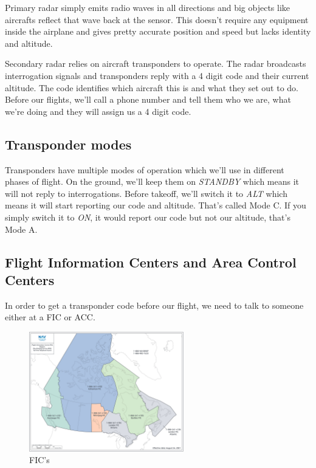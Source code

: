 \documentclass[12pt,letterpaper]{article}
\begin{document}
        Primary radar simply emits radio waves in all directions and big objects like aircrafts reflect that wave back at the sensor. This doesn't require any equipment inside the airplane and gives pretty accurate position and speed but lacks identity and altitude.
        
        Secondary radar relies on aircraft transponders to operate. The radar broadcasts interrogation signals and transponders reply with a 4 digit code and their current altitude. The code identifies which aircraft this is and what they set out to do. Before our flights, we'll call a phone number and tell them who we are, what we're doing and they will assign us a 4 digit code.
        
        \subsection{Transponder modes}
        Transponders have multiple modes of operation which we'll use in different phases of flight. On the ground, we'll keep them on \emph{STANDBY} which means it will not reply to interrogations. Before takeoff, we'll switch it to \emph{ALT} which means it will start reporting our code and altitude. That's called Mode C. If you simply switch it to \emph{ON}, it would report our code but not our altitude, that's Mode A.
        
        \subsection{Flight Information Centers and Area Control Centers}
        In order to get a transponder code before our flight, we need to talk to someone either at a FIC or ACC.
        
        \begin{figure}[h]
          \begin{center}
            \includegraphics[width=0.6\textwidth]{fics.jpg}
          \end{center}
          \caption{FIC's}
          \label{fig:fics}
        \end{figure}
\end{document}

